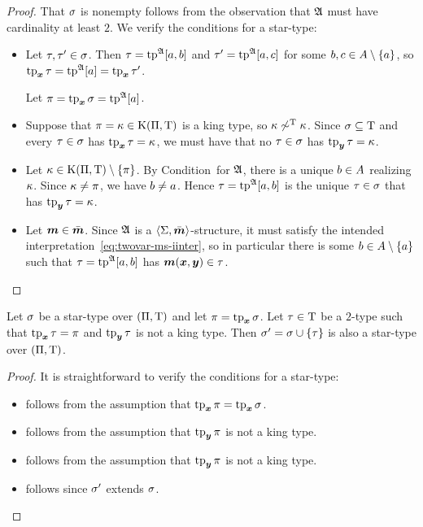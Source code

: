 \begin{proof}
That $\sigma$ is nonempty follows from the observation that $\mathfrak{A}$ must have
cardinality at least $2$.
We verify the conditions for a star-type:
\begin{itemize}
  \item[\refcondstpx]
  Let $\tau,{\tau'} \in \sigma$. 
  Then $\tau = \operatorname{tp}^{\mathfrak{A}}[a,b]$ and ${\tau'} = \operatorname{tp}^{\mathfrak{A}}[a,c]$ for some
  $b,c \in A \setminus \left\{a\right\}$, so $\operatorname{tp}_{\bm{x}}\tau = \operatorname{tp}^{\mathfrak{A}}[a] =
  \operatorname{tp}_{\bm{x}}{\tau'}$.
  
  Let $\pi = \operatorname{tp}_{\bm{x}}\sigma = \operatorname{tp}^{\mathfrak{A}}[a]$.
  \item[\refcondstpkx]
  Suppose that $\pi = \kappa \in \mathrm{K}(\Pi,\mathrm{T})$ is a king type,
  so $\kappa \not\sim^{\mathrm{T}} \kappa$. Since $\sigma \subseteq \mathrm{T}$ and every
  $\tau \in \sigma$ has $\operatorname{tp}_{\bm{x}}\tau = \kappa$, we must have that no 
  $\tau \in \sigma$ has $\operatorname{tp}_{\bm{y}}\tau = \kappa$.
  \item[\refcondstpky]
  Let $\kappa \in \mathrm{K}(\Pi,\mathrm{T}) \setminus \left\{\pi\right\}$. By
  Condition~ for $\mathfrak{A}$, there is a unique $b \in A$
  realizing $\kappa$. Since $\kappa \neq \pi$, we have $b \neq a$.
  Hence $\tau = \operatorname{tp}^{\mathfrak{A}}[a,b]$ is the unique $\tau \in \sigma$ that has
  $\operatorname{tp}_{\bm{y}}\tau = \kappa$.
  \item[\refcondstpm]
  Let $\bm{m} \in \bar{\bm{m}}$. Since $\mathfrak{A}$ is a $\left\langle \mathrm{\Sigma},\bar{\bm{m}} \right\rangle$-structure, it must
  satisfy the intended interpretation~\cref{eq:twovar-ms-iinter}, so in
  particular there is some $b \in A \setminus \left\{a\right\}$ such that $\tau =
  \operatorname{tp}^{\mathfrak{A}}[a,b]$ has $\bm{m}(\bm{x},\bm{y}) \in \tau$.
\end{itemize}
\end{proof}

\begin{remark}\label{rem:star-type-ext}
Let $\sigma$ be a star-type over $(\Pi,\mathrm{T})$ and let $\pi = \operatorname{tp}_{\bm{x}}\sigma$.
Let $\tau \in \mathrm{T}$ be a $2$-type such that $\operatorname{tp}_{\bm{x}}\tau = \pi$ and
$\operatorname{tp}_{\bm{y}}\tau$ is not a king type.
Then ${\sigma'} = \sigma \cup \left\{\tau\right\}$ is also a star-type over
$(\Pi,\mathrm{T})$.
\end{remark}
\begin{proof}
It is straightforward to verify the conditions for a star-type:
\begin{itemize}
  \item[\refcondstpx] follows from the assumption that $\operatorname{tp}_{\bm{x}}\pi = \operatorname{tp}_{\bm{x}}\sigma$.
  \item[\refcondstpkx] follows from the assumption that $\operatorname{tp}_{\bm{y}}\pi$ is not a
  king type.
  \item[\refcondstpky] follows from the assumption that $\operatorname{tp}_{\bm{y}}\pi$ is not a
  king type.
  \item[\refcondstpm] follows since ${\sigma'}$ extends $\sigma$.
\end{itemize}
\end{proof}


